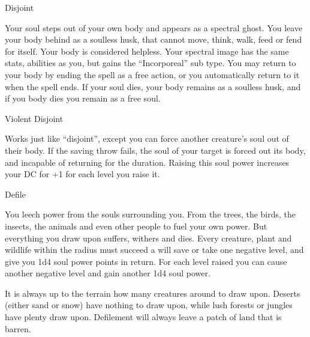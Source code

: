 \begin{soulpower}{Disjoint}
  \components{-}
  \rangepersonal

  Your soul steps out of your own body and appears as a spectral ghost. You
  leave your body behind as a soulless husk, that cannot move, think, walk,
  feed or fend for itself. Your body is considered helpless.
  Your spectral image has the same stats, abilities as you, but gains the
  ``Incorporeal'' sub type. You may return to your body by ending the spell
  as a free action, or you automatically return to it when the spell ends.
  If your soul dies, your body remains as a soulless husk, and if you body
  dies you remain as a free soul.
\end{soulpower}

\begin{soulpower}{Violent Disjoint}
  \rangetouch

  Works just like ``disjoint'', except you can force another creature's soul
  out of their body. If the saving throw fails, the soul of your target is
  forced out its body, and incapable of returning for the duration. Raising
  this soul power increases your DC for +1 for each level you raise it.
\end{soulpower}

\begin{soulpower}{Defile}
  \rangeclose

  You leech power from the souls surrounding you. From the trees, the birds,
  the insects, the animals and even other people to fuel your own power. But
  everything you draw upon suffers, withers and dies. Every creature, plant
  and wildlife within the radius must succeed a will save or take one negative
  level, and give you 1d4 soul power points in return. For each level raised
  you can cause another negative level and gain another 1d4 soul power.

  It is always up to the terrain how many creatures around to draw upon.
  Deserts (either sand or snow) have nothing to draw upon, while lush forests
  or jungles have plenty draw upon. Defilement will always leave a patch of
  land that is barren.
\end{soulpower}

